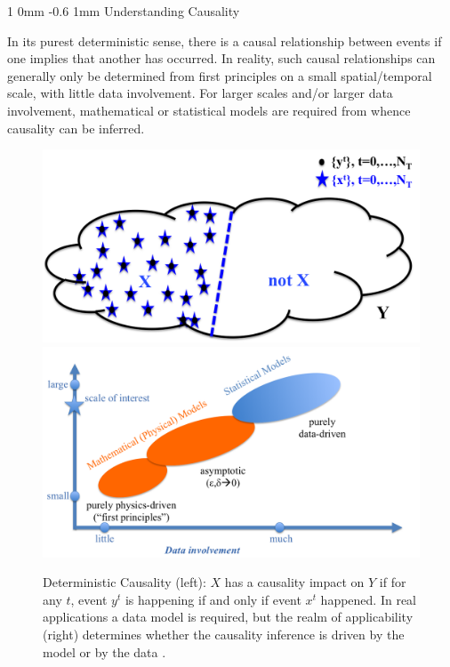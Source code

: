 \documentclass[a0,portrait]{a0poster}
\makeatletter
\renewcommand{\section}{\@startsection
        {section}%
        {1}%
        {0mm}%
        {-0.6\baselineskip}%
        {1mm}%
        {\Large\color{NTNUBlue}\bfseries}}%
\makeatother
\begin{document}
\begin{multicols}{2}
\section{Understanding Causality}
\label{causality}

{\large In its purest deterministic sense, there is a causal relationship between events if one implies that another has occurred.  In reality, such causal relationships can generally only be determined from first principles on a small spatial/temporal scale, with little data involvement.  For larger scales and/or larger data involvement, mathematical or statistical models are required from whence causality can be inferred.}

\begin{figure}[H]
    \begin{center}
         \includegraphics[width=15cm, angle=0, clip = true]{Deterministic_Causality.png}
        \hfil
        \includegraphics[width=15cm, angle=0, clip = true]{Causality_Model_or_Data_Driven.png}
   \caption{Deterministic Causality (left):  $X$ has a causality impact on $Y$ if for any $t$, event $y^t$ is happening if and only if event $x^t$ happened.  In real applications a data model is required, but the realm of applicability (right) determines whether the causality inference is driven by the model or by the data .}
    \end{center}
\end{figure}


\end{multicols}
\end{document}
